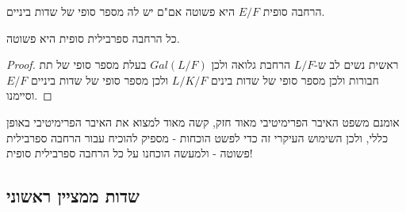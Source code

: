 \documentclass{tstextbook}
\begin{document}
\begin{proposition}
הרחבה סופית \(E / F\) היא פשוטה אם"ם יש לה מספר סופי של שדות ביניים.

\end{proposition}
\begin{theorem}
כל הרחבה ספרבילית סופית היא פשוטה.

\end{theorem}
\begin{proof}
ראשית נשים לב ש-\(L / F\) הרחבת גלואה ולכן \(Gal(L / F)\) בעלת מספר סופי של תת חבורות ולכן מספר סופי של שדות בינים \(L / K / F\) ולכן מספר סופי של שדות ביניים \(E / F\) וסיימנו.

\end{proof}
\begin{remark}
אומנם משפט האיבר הפרימיטיבי מאוד חזק, קשה מאוד למצוא את האיבר הפרימיטיבי באופן כללי, ולכן השימוש העיקרי זה כדי לפשט הוכחות - מספיק להוכיח עבור הרחבה ספרבילית פשוטה - ולמעשה הוכחנו על כל הרחבה ספרבילית סופית!

\end{remark}
\subsection{שדות ממציין ראשוני}
\end{document}
